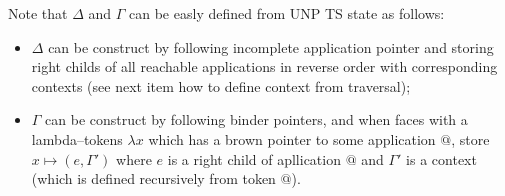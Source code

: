 \documentclass[a4paper, 10pt]{article}
\begin{document}
Note that $\Delta$ and $\Gamma$ can be easly defined from UNP TS state as follows:
\begin{itemize}
\item $\Delta$ can be construct by following incomplete application pointer and storing right childs of all reachable applications in reverse order with corresponding contexts (see next item how to define context from traversal);
\item $\Gamma$ can be construct by following binder pointers, and when faces with a lambda--tokens $\lambda x$ which has a brown pointer to some application $@$, store $x \mapsto (e, \Gamma')$ where $e$ is a right child of apllication $@$ and $\Gamma'$ is a context (which is defined recursively from token $@$).
\end{itemize}






\end{document}
